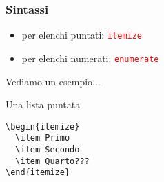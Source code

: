 \begin{frame}[fragile]
 \frametitle{Sintassi}
 
 \begin{itemize}
  \item per elenchi puntati: \textcolor{red}{\texttt{itemize}}
  \item per elenchi numerati: \textcolor{red}{\texttt{enumerate}}
 \end{itemize}
 
 Vediamo un esempio...\\


\begin{esempio}{Una lista puntata}

\begin{code}
\begin{verbatim}
\begin{itemize}
  \item Primo
  \item Secondo
  \item Quarto???
\end{itemize}
\end{verbatim}
\end{code}

\end{esempio}

\end{frame}